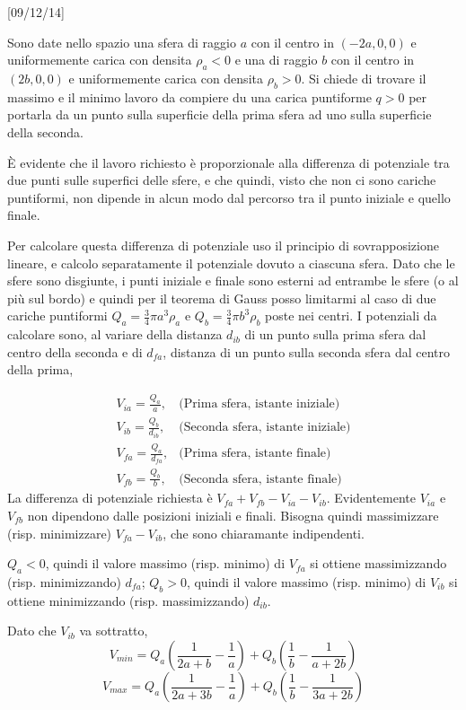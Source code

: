 \documentclass[../main.tex]{subfiles}
\begin{document}
[09/12/14] %

\textex
Sono date nello spazio una sfera di raggio $a$ con il centro in $(-2a,0,0)$ e uniformemente carica con densita $\rho_a<0$ e una di raggio $b$ con il centro in $(2b,0,0)$ e uniformemente carica con densita $\rho_b>0$. Si chiede di trovare il massimo e il minimo lavoro da compiere du una carica puntiforme $q>0$ per portarla da un punto sulla superficie della prima sfera ad uno sulla superficie della seconda.

\solution
\`E evidente che il lavoro richiesto \`e proporzionale alla differenza di potenziale tra due punti sulle superfici delle sfere, e che quindi, visto che non ci sono cariche puntiformi, non dipende in alcun modo dal percorso tra il punto iniziale e quello finale.

Per calcolare questa differenza di potenziale uso il principio di sovrapposizione lineare, e calcolo separatamente il potenziale dovuto a ciascuna sfera. Dato che le sfere sono disgiunte, i punti iniziale e finale sono esterni ad entrambe le sfere (o al pi\`u sul bordo) e quindi per il teorema di Gauss posso limitarmi al caso di due cariche puntiformi $Q_a=\frac{3}{4} \pi a^3 \rho_a $ e $Q_b=\frac{3}{4} \pi b^3 \rho_b $  poste nei centri.\newline
I potenziali da calcolare sono, al variare della distanza $d_{ib}$ di un punto sulla prima sfera dal centro della seconda e di $d_{fa}$, distanza di un punto sulla seconda sfera dal centro della prima,

\begin{subequations}
  \label{dsc:potenziali}
  \begin{align}
    V_{ia}=\frac{Q_a}{a},	& \text{(Prima sfera, istante iniziale)} \\
    V_{ib}=\frac{Q_b}{d_{ib}},	& \text{(Seconda sfera, istante iniziale)} \\
    V_{fa}=\frac{Q_a}{d_{fa}},	& \text{(Prima sfera, istante finale)} \\
    V_{fb}=\frac{Q_b}{b},	& \text{(Seconda sfera, istante finale)}
  \end{align}
\end{subequations}
La differenza di potenziale richiesta \`e $V_{fa}+V_{fb}-V_{ia}-V_{ib}$.
Evidentemente $V_{ia}$ e $V_{fb}$ non dipendono dalle posizioni iniziali e finali. Bisogna quindi massimizzare (risp. minimizzare) $V_{fa}-V_{ib}$, che sono chiaramante indipendenti.

$Q_a<0$, quindi il valore massimo (risp. minimo) di $V_{fa}$ si ottiene massimizzando (risp. minimizzando) $d_{fa}$; $Q_b>0$, quindi il valore massimo (risp. minimo) di $V_{ib}$ si ottiene minimizzando (risp. massimizzando) $d_{ib}$.

Dato che $V_{ib}$ va sottratto,
\begin{equation*}
  V_{min}=Q_a \left(\frac{1}{2a+b}- \frac{1}{a} \right)+Q_b\left(\frac{1}{b}-\frac{1}{a+2b}\right)
\end{equation*}
\begin{equation*}
  V_{max}=Q_a\left(\frac{1}{2a+3b}- \frac{1}{a}\right)+Q_b\left(\frac{1}{b}-\frac{1}{3a+2b}\right)
\end{equation*}
\end{document}
